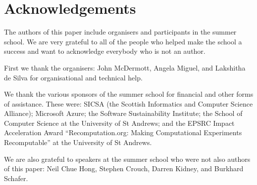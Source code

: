 \section*{Acknowledgements}
\label{s:ack}

The authors of this paper include organisers and participants in the
summer school. We are very grateful to all of the people who helped
make the school a success and want to acknowledge everybody who is not an
author.

First we thank the organisers: John McDermott, Angela Miguel, and Lakshitha de Silva for organisational and technical help.

We thank the various sponsors of the summer school for financial and other forms of assistance.
These were: SICSA (the Scottish Informatics and Computer Science Alliance); 
Microsoft Azure; the Software Sustainability Institute; 
the School of Computer Science at the University of St Andrews; 
and the EPSRC Impact Acceleration Award ``Recomputation.org: Making
Computational Experiments Recomputable''
at the University of St Andrews.

We are also grateful to speakers at the summer school who were not also authors of this paper: 
Neil Chue Hong,
Stephen Crouch, 
Darren Kidney, and
Burkhard Schafer.
